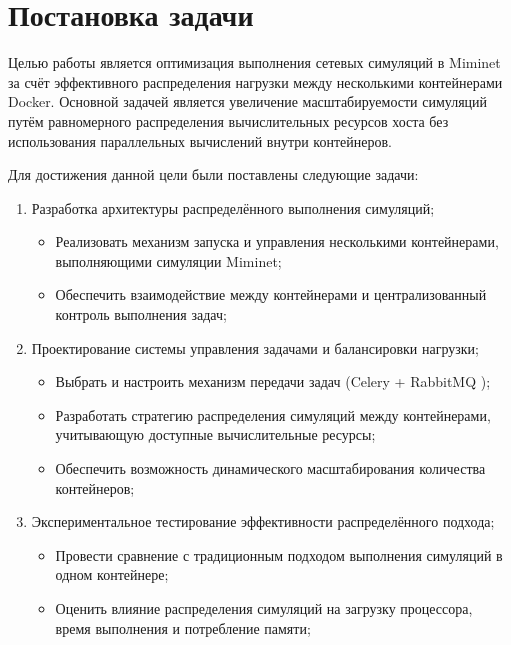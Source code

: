 
\section{Постановка задачи}
\label{sec:task}

Целью работы является оптимизация выполнения сетевых симуляций в Miminet\cite{miminet} за счёт эффективного распределения нагрузки между несколькими контейнерами Docker.
Основной задачей является увеличение масштабируемости симуляций путём равномерного распределения вычислительных ресурсов хоста без использования параллельных вычислений внутри контейнеров.

Для достижения данной цели были поставлены следующие задачи:
\begin{enumerate}
    \item Разработка архитектуры распределённого выполнения симуляций;
        \begin{itemize}
            \item Реализовать механизм запуска и управления несколькими контейнерами, выполняющими симуляции Miminet\cite{miminet};
            \item Обеспечить взаимодействие между контейнерами и централизованный контроль выполнения задач;
        \end{itemize}
    \item Проектирование системы управления задачами и балансировки нагрузки;
        \begin{itemize}
            \item Выбрать и настроить механизм передачи задач (Celery \cite{celery} + RabbitMQ \cite{rabbitmq});
            \item Разработать стратегию распределения симуляций между контейнерами, учитывающую доступные вычислительные ресурсы;
            \item Обеспечить возможность динамического масштабирования количества контейнеров;
        \end{itemize}
    \item Экспериментальное тестирование эффективности распределённого подхода;
        \begin{itemize}
            \item Провести сравнение с традиционным подходом выполнения симуляций в одном контейнере;
            \item Оценить влияние распределения симуляций на загрузку процессора, время выполнения и потребление памяти;

\end{itemize}
\end{enumerate}
